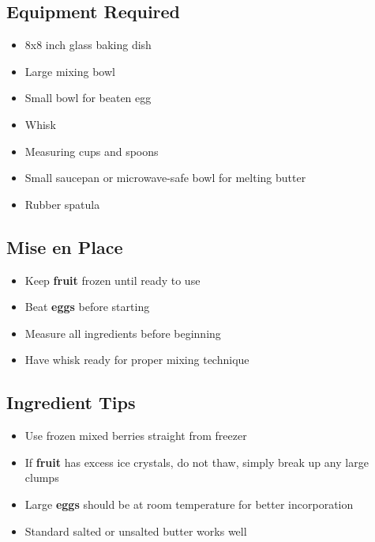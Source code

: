 \documentclass[11pt,letterpaper]{article}
\begin{document}
\newpage

{\small
\setlength{\columnsep}{20pt}
\setlength{\multicolsep}{6pt}
\begin{multicols}{2}
\setlength{\parindent}{0pt}
\setlength{\parskip}{4pt}

\subsection*{Equipment Required}
\begin{itemize}
    \item 8x8 inch glass baking dish
    \item Large mixing bowl
    \item Small bowl for beaten egg
    \item Whisk
    \item Measuring cups and spoons
    \item Small saucepan or microwave-safe bowl for melting butter
    \item Rubber spatula
\end{itemize}

\subsection*{Mise en Place}
\begin{itemize}
    \item Keep \textbf{fruit} frozen until ready to use
    \item Beat \textbf{eggs} before starting
    \item Measure all ingredients before beginning
    \item Have whisk ready for proper mixing technique
\end{itemize}

\subsection*{Ingredient Tips}
\begin{itemize}
    \item Use frozen mixed berries straight from freezer
    \item If \textbf{fruit} has excess ice crystals, do not thaw, simply break up any large clumps
    \item Large \textbf{eggs} should be at room temperature for better incorporation
    \item Standard salted or unsalted butter works well
\end{itemize}


\end{multicols}}
\end{document}
